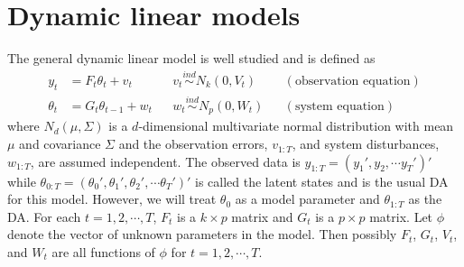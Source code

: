 \documentclass{article}
\begin{document}
\section{Dynamic linear models} \label{sec:DLMs} 

The general dynamic linear model is well studied \cite{harrison1999bayesian,petris2009dynamic,prado2010time} and is defined as
\begin{align}
y_t &= F_t\theta_t + v_t && v_t \stackrel{ind}{\sim} N_k(0,V_t) && (\mbox{observation equation}) \label{dlmtdobseq}\\
 \theta_t &= G_t\theta_{t-1} + w_t && w_t \stackrel{ind}{\sim} N_p(0,W_t) && (\mbox{system equation}) \label{dlmtdsyseq}
\end{align}
where $N_d(\mu,\Sigma)$ is a $d$-dimensional multivariate normal distribution with mean $\mu$ and covariance $\Sigma$ and the observation errors, $v_{1:T}$, and system disturbances, $w_{1:T}$, are assumed independent. The observed data is $y_{1:T} = (y_1',y_2,\cdots y_T')'$ while $\theta_{0:T}=(\theta_0',\theta_1',\theta_2',\cdots \theta_T')'$ is called the latent states and is the usual DA for this model. However, we will treat $\theta_0$ as a model parameter and $\theta_{1:T}$ as the DA. For each $t=1,2,\cdots,T$, $F_t$ is a $k\times p$ matrix and $G_t$ is a $p\times p$ matrix. Let $\phi$ denote the vector of unknown parameters in the model. Then possibly $F_{t}$, $G_{t}$, $V_{t}$, and $W_{t}$ are all functions of $\phi$ for $t=1,2,\cdots,T$. 
\end{document}
